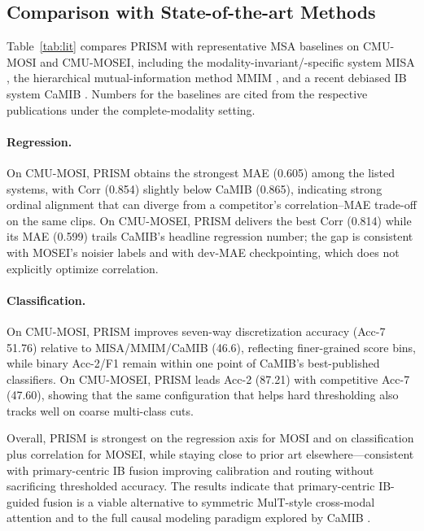 \subsection{Comparison with State-of-the-art Methods}
\label{sec:res-baseline}
Table~\ref{tab:lit} compares PRISM with representative MSA baselines on
CMU-MOSI and CMU-MOSEI, including the modality-invariant/-specific system
MISA \citep{hazarika2020misa}, the hierarchical mutual-information method
MMIM \citep{han2021mmim}, and a recent debiased IB system
CaMIB \citep{jiang2025towards}.
Numbers for the baselines are cited from the respective publications under
the complete-modality setting.

\paragraph{Regression.}
On CMU-MOSI, PRISM obtains the strongest MAE (0.605) among the listed systems,
with Corr (0.854) slightly below CaMIB (0.865), indicating strong ordinal
alignment that can diverge from a competitor's correlation--MAE trade-off on
the same clips.
On CMU-MOSEI, PRISM delivers the best Corr (0.814) while its MAE (0.599) trails
CaMIB's headline regression number; the gap is consistent with MOSEI's
noisier labels and with dev-MAE checkpointing, which does not explicitly
optimize correlation.

\paragraph{Classification.}
On CMU-MOSI, PRISM improves seven-way discretization accuracy (Acc-7 51.76)
relative to MISA/MMIM/CaMIB (46.6), reflecting finer-grained score bins, while
binary Acc-2/F1 remain within one point of CaMIB's best-published classifiers.
On CMU-MOSEI, PRISM leads Acc-2 (87.21) with competitive Acc-7 (47.60),
showing that the same configuration that helps hard thresholding also tracks
well on coarse multi-class cuts.

Overall, PRISM is strongest on the regression axis for MOSI and on
classification plus correlation for MOSEI, while staying close to prior art
elsewhere---consistent with primary-centric IB fusion improving calibration
and routing without sacrificing thresholded accuracy.
The results indicate that primary-centric IB-guided fusion is a viable
alternative to symmetric MulT-style cross-modal attention
\citep{tsai2019multimodal} and to the full causal modeling paradigm explored
by CaMIB \citep{jiang2025towards}.

